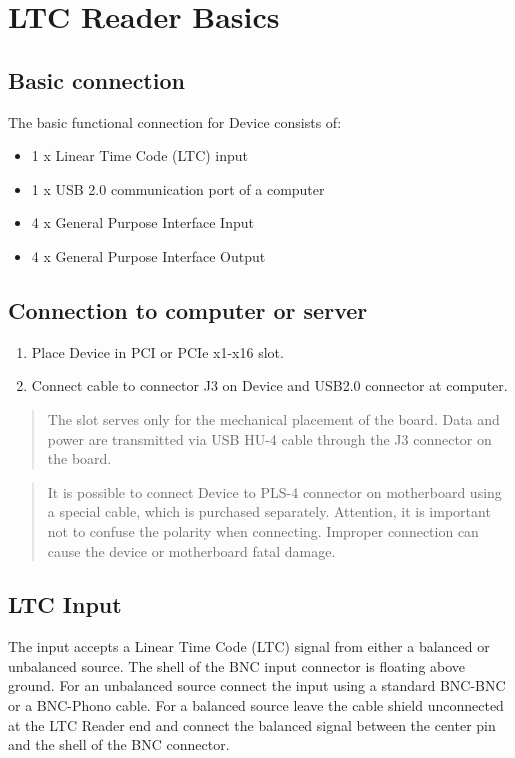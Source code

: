 \documentclass{article}
\begin{document}
	\section{LTC Reader Basics}\label{ltc-reader-basics}
		\subsection{Basic connection}\label{basic-connection}
			The basic functional connection for Device consists of:
			\begin{itemize}
				\item 1 x Linear Time Code (LTC) input
				\item 1 x USB 2.0 communication port of a computer
				\item 4 x General Purpose Interface Input
				\item 4 x General Purpose Interface Output
			\end{itemize}
	
		\subsection{Connection to computer or server}\label{connection-to-computer-or-server}
			\begin{enumerate}
				\item Place Device in PCI or PCIe x1-x16 slot.
				\item Connect cable to connector J3 on Device and USB2.0 connector at
				computer.
			\end{enumerate}
			\begin{quote}
				The slot serves only for the mechanical placement of the board. Data and 	power are transmitted via USB HU-4 cable through the J3 connector on the board.
			\end{quote}
			\begin{quote}
				It is possible to connect Device to PLS-4 connector on motherboard using a special cable, which is purchased separately. Attention, it is important not to confuse the polarity when connecting. Improper connection can cause the device or motherboard fatal damage.
			\end{quote}
	
		\subsection{LTC Input}\label{ltc-input}
			The input accepts a Linear Time Code (LTC) signal from either a balanced or unbalanced source. The shell of the BNC input connector is floating above ground. For an unbalanced source connect the input using a standard BNC-BNC or a BNC-Phono cable. For a balanced source leave the cable shield unconnected at the LTC Reader end and connect the balanced signal between the center pin and the shell of the BNC connector.
	
\end{document}
